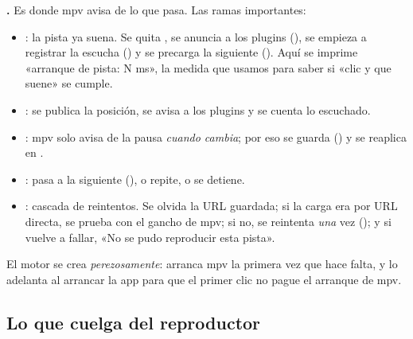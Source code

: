 \textbf{.} Es donde mpv avisa de lo que pasa. Las ramas importantes:

\begin{itemize}
  \item {}: la pista ya suena. Se quita , se anuncia a los plugins
  (), se empieza a registrar la escucha () y se precarga la
  siguiente (). Aquí se imprime «arranque de pista: N ms», la medida que
  usamos para saber si «clic y que suene» se cumple.
  \item {}: se publica la posición, se avisa a los plugins y se cuenta lo escuchado.
  \item {}: mpv solo avisa de la pausa \emph{cuando cambia}; por eso se guarda
  () y se reaplica en .
  \item {}: pasa a la siguiente (), o repite, o se detiene.
  \item {}: cascada de reintentos. Se olvida la URL guardada; si la carga era por URL
  directa, se prueba con el gancho de mpv; si no, se reintenta \emph{una} vez ();
  y si vuelve a fallar, «No se pudo reproducir esta pista».
\end{itemize}

El motor se crea \emph{perezosamente}:  arranca mpv la primera vez que
hace falta, y  lo adelanta al arrancar la app para que el primer clic no pague
el arranque de mpv.

\subsection{Lo que cuelga del reproductor}

